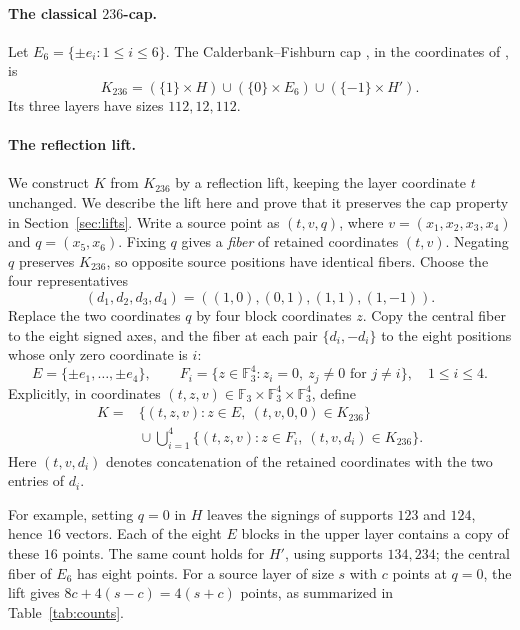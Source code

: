 \documentclass[11pt]{article}
\newcommand{\F}{\mathbb F_3}
\begin{document}
\paragraph{The classical $236$-cap.}
Let $E_6=\{\pm e_i:1\le i\le6\}$. The Calderbank--Fishburn cap
\cite{calderbank}, in the coordinates of \cite[Theorem 5 and Table 2]{smallcaps}, is
\begin{equation}\label{eq:236}
 K_{236}=(\{1\}\times H)\cup(\{0\}\times E_6)
                       \cup(\{-1\}\times H').
\end{equation}
Its three layers have sizes $112,12,112$.

\paragraph{The reflection lift.}
We construct $K$ from $K_{236}$ by a reflection lift, keeping the layer
coordinate $t$ unchanged. We describe the lift here and prove that it
preserves the cap property in Section~\ref{sec:lifts}.
Write a source point as $(t,v,q)$, where $v=(x_1,x_2,x_3,x_4)$ and
$q=(x_5,x_6)$. Fixing $q$ gives a \emph{fiber} of retained coordinates
$(t,v)$. Negating $q$ preserves $K_{236}$, so opposite source positions
have identical fibers. Choose the four representatives
\[
 (d_1,d_2,d_3,d_4)=((1,0),(0,1),(1,1),(1,-1)).
\]
Replace the two coordinates $q$ by four block coordinates $z$.
Copy the central fiber to the eight signed axes, and the fiber at each
pair $\{d_i,-d_i\}$ to the eight positions whose only zero coordinate is $i$:
\[
 E=\{\pm e_1,\ldots,\pm e_4\},\qquad
 F_i=\{z\in\F^4:z_i=0,\ z_j\ne0\text{ for }j\ne i\},\quad 1\le i\le4.
\]
Explicitly, in coordinates $(t,z,v)\in\F\times\F^4\times\F^4$, define
\begin{equation}\label{eq:cap}
\begin{split}
 K={}&\{(t,z,v):z\in E,\ (t,v,0,0)\in K_{236}\}\\
 &{}\cup\bigcup_{i=1}^4
 \{(t,z,v):z\in F_i,\ (t,v,d_i)\in K_{236}\}.
\end{split}
\end{equation}
Here $(t,v,d_i)$ denotes concatenation of the retained coordinates with
the two entries of $d_i$.

For example, setting $q=0$ in $H$ leaves the signings of supports $123$
and $124$, hence $16$ vectors. Each of the eight $E$ blocks in the upper
layer contains a copy of these $16$ points. The same count holds for
$H'$, using supports $134,234$; the central fiber of $E_6$ has eight points.
For a source layer of size $s$ with $c$ points at $q=0$, the lift
gives $8c+4(s-c)=4(s+c)$ points, as summarized in Table~\ref{tab:counts}.
\end{document}
